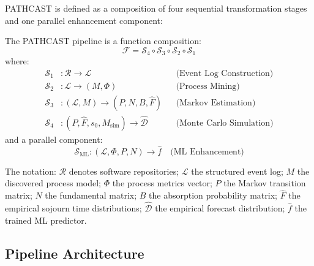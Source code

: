 PATHCAST is defined as a composition of four sequential transformation
stages and one parallel enhancement component:

\begin{definition}
\label{def:pipeline}
The PATHCAST pipeline is a function composition:
\begin{equation}
\label{eq:pipeline}
\mathcal{F} = \mathcal{S}_4 \circ \mathcal{S}_3 \circ \mathcal{S}_2 \circ \mathcal{S}_1
\end{equation}
where:
\begin{align}
\mathcal{S}_1 &: \mathcal{R} \to \mathcal{L}
    && \text{(Event Log Construction)} \label{eq:stage1-sig} \\
\mathcal{S}_2 &: \mathcal{L} \to (M, \Phi)
    && \text{(Process Mining)} \label{eq:stage2-sig} \\
\mathcal{S}_3 &: (\mathcal{L}, M) \to (P, N, B, \hat{F})
    && \text{(Markov Estimation)} \label{eq:stage3-sig} \\
\mathcal{S}_4 &: (P, \hat{F}, s_0, M_{\text{sim}}) \to \hat{\mathcal{D}}
    && \text{(Monte Carlo Simulation)} \label{eq:stage4-sig}
\end{align}
and a parallel component:
\begin{equation}
\mathcal{S}_{\text{ML}} : (\mathcal{L}, \Phi, P, N) \to \hat{f}
    \quad \text{(ML Enhancement)} \label{eq:ml-sig}
\end{equation}
\end{definition}

The notation: $\mathcal{R}$ denotes software repositories; $\mathcal{L}$
the structured event log; $M$ the discovered process model; $\Phi$ the
process metrics vector; $P$ the Markov transition matrix; $N$ the
fundamental matrix; $B$ the absorption probability matrix; $\hat{F}$ the
empirical sojourn time distributions; $\hat{\mathcal{D}}$ the empirical
forecast distribution; $\hat{f}$ the trained ML predictor.

\subsection{Pipeline Architecture}
\label{sec:pipeline-arch}

